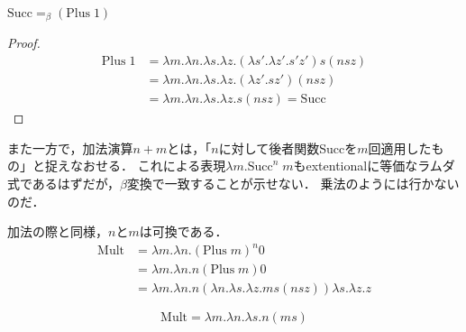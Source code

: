 \documentclass[uplatex, dvipdfmx]{jsreport}
\begin{document}
\begin{proposition}
    $\mathrm{Succ}=_\beta(\mathrm{Plus}\;1)$
\end{proposition}
\begin{proof}
    \begin{align*}
        \mathrm{Plus}\; 1 &= \lambda m.\lambda n.\lambda s.\lambda z.(\lambda s'.\lambda z'.s'z')s(nsz) \\
        &= \lambda m.\lambda n.\lambda s.\lambda z.(\lambda z'.sz')(nsz) \\
        &= \lambda m.\lambda n.\lambda s.\lambda z.s(nsz) = \mathrm{Succ}
    \end{align*}
\end{proof}
\begin{remark}[謎]
    また一方で，加法演算$n+m$とは，「$n$に対して後者関数Succを$m$回適用したもの」と捉えなおせる．
    これによる表現$\lambda m.\mathrm{Succ}^n\; m$もextentionalに等価なラムダ式であるはずだが，$\beta$変換で一致することが示せない．
    乗法のようには行かないのだ．
\end{remark}

\begin{definition}[乗法]
    加法の際と同様，$n$と$m$は可換である．
    \begin{align*}
        \mathrm{Mult} &= \lambda m.\lambda n.(\mathrm{Plus}\; m)^n 0 \\
        &= \lambda m.\lambda n.n(\mathrm{Plus}\; m) 0 \\
        &= \lambda m.\lambda n.n(\lambda n.\lambda s.\lambda z.ms(nsz)) \lambda s.\lambda z.z
    \end{align*}
\end{definition}
\begin{proposition}[乗法の別表現]
    \[ \mathrm{Mult} = \lambda m.\lambda n.\lambda s.n(ms) \]
\end{proposition}
\end{document}
